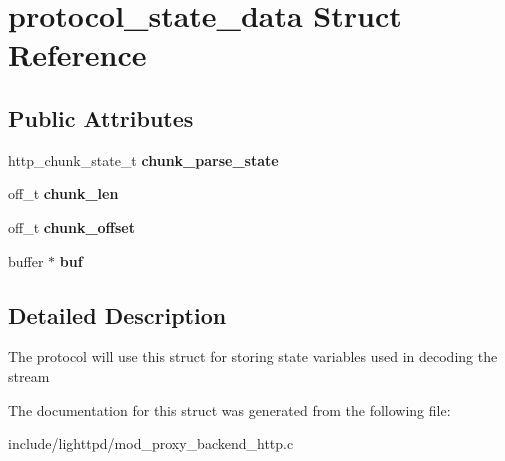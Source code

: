 \hypertarget{structprotocol__state__data}{
\section{protocol\_\-state\_\-data Struct Reference}
\label{structprotocol__state__data}
}
\subsection*{Public Attributes}
\begin{CompactItemize}
\item 
\hypertarget{structprotocol__state__data_b8df5c47e54e75eb56c4f8e368d39567}{
http\_\-chunk\_\-state\_\-t \textbf{chunk\_\-parse\_\-state}}
\label{structprotocol__state__data_b8df5c47e54e75eb56c4f8e368d39567}

\item 
\hypertarget{structprotocol__state__data_c1079ea961d93c88795bd7634f295f36}{
off\_\-t \textbf{chunk\_\-len}}
\label{structprotocol__state__data_c1079ea961d93c88795bd7634f295f36}

\item 
\hypertarget{structprotocol__state__data_17cdef79d0a9c3d1d5fa0ac4ba6771e7}{
off\_\-t \textbf{chunk\_\-offset}}
\label{structprotocol__state__data_17cdef79d0a9c3d1d5fa0ac4ba6771e7}

\item 
\hypertarget{structprotocol__state__data_33674b8f202093b793c868e2d6c05da6}{
buffer $\ast$ \textbf{buf}}
\label{structprotocol__state__data_33674b8f202093b793c868e2d6c05da6}

\end{CompactItemize}


\subsection{Detailed Description}
The protocol will use this struct for storing state variables used in decoding the stream 

The documentation for this struct was generated from the following file:\begin{CompactItemize}
\item 
include/lighttpd/mod\_\-proxy\_\-backend\_\-http.c\end{CompactItemize}

